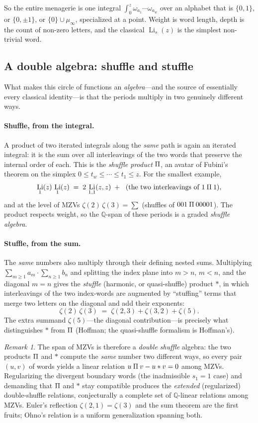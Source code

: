 \documentclass[11pt]{article}
\DeclareMathOperator{\Li}{Li}
\newcommand{\shuffle}{\mathbin{\rotatebox[origin=c]{180}{\ensuremath{\amalg}}}}
\theoremstyle{plain}
\theoremstyle{remark}
\newtheorem{remark}[theorem]{Remark}
\begin{document}
So the entire menagerie is one integral $\int_0^z \omega_{a_1}\cdots\omega_{a_w}$ over an alphabet that is $\{0,1\}$, or $\{0,\pm1\}$, or $\{0\}\cup\mu_\infty$, specialized at a point. Weight is word length, depth is the count of non-zero letters, and the classical $\Li_s(z)$ is the simplest non-trivial word.

\subsection{A double algebra: shuffle and stuffle}

What makes this circle of functions an \emph{algebra}---and the source of essentially every classical identity---is that the periods multiply in two genuinely different ways.

\paragraph{Shuffle, from the integral.} A product of two iterated integrals along the \emph{same} path is again an iterated integral: it is the sum over all interleavings of the two words that preserve the internal order of each. This is the \emph{shuffle product} $\shuffle$, an avatar of Fubini's theorem on the simplex $0\le t_w\le\cdots\le t_1\le z$. For the smallest example,
\[
  \Li_1(z)\,\Li_1(z)\;=\;2\,\Li_{1,1}(z,z)\;+\;\ \text{(the two interleavings of }1\shuffle1),
\]
and at the level of MZVs $\zeta(2)\,\zeta(3)=\sum$ (shuffles of $001\shuffle 00001$). The product respects weight, so the $\mathbb{Q}$-span of these periods is a graded \emph{shuffle algebra}.

\paragraph{Stuffle, from the sum.} The \emph{same} numbers also multiply through their defining nested sums. Multiplying $\sum_{m\ge1}a_m\cdot\sum_{n\ge1}b_n$ and splitting the index plane into $m>n$, $m<n$, and the diagonal $m=n$ gives the \emph{stuffle} (harmonic, or quasi-shuffle) product $\ast$, in which interleavings of the two index-words are augmented by ``stuffing'' terms that merge two letters on the diagonal and add their exponents:
\[
  \zeta(2)\,\zeta(3)\;=\;\zeta(2,3)+\zeta(3,2)+\zeta(5).
\]
The extra summand $\zeta(5)$---the diagonal contribution---is precisely what distinguishes $\ast$ from $\shuffle$ (Hoffman; the quasi-shuffle formalism is Hoffman's). 

\begin{remark}
The span of MZVs is therefore a \emph{double shuffle} algebra: the two products $\shuffle$ and $\ast$ compute the \emph{same} number two different ways, so every pair $(u,v)$ of words yields a linear relation $u\shuffle v - u\ast v=0$ among MZVs. Regularizing the divergent boundary words (the inadmissible $s_1=1$ case) and demanding that $\shuffle$ and $\ast$ stay compatible produces the \emph{extended} (regularized) double-shuffle relations, conjecturally a complete set of $\mathbb{Q}$-linear relations among MZVs. Euler's reflection $\zeta(2,1)=\zeta(3)$ and the sum theorem are the first fruits; Ohno's relation is a uniform generalization spanning both.
\end{remark}
\end{document}
